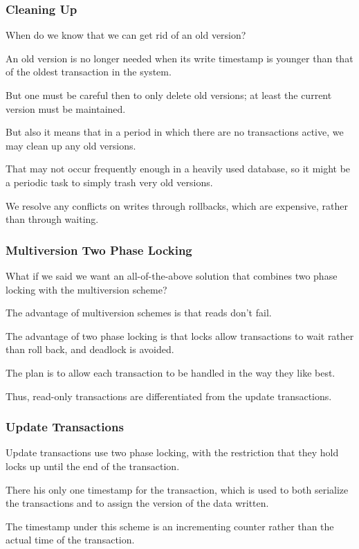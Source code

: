 \begin{frame}
\frametitle{Cleaning Up}

When do we know that we can get rid of an old version? 

An old version is no longer needed when its write timestamp is younger than that of the oldest transaction in the system. 

But one must be careful then to only delete old versions; at least the current version must be maintained. 

But also it means that in a period in which there are no transactions active, we may clean up any old versions. 

That may not occur frequently enough in a heavily used database, so it might be a periodic task to simply trash very old versions.

We resolve any conflicts on writes through rollbacks, which are expensive, rather than through waiting.

\end{frame}

\begin{frame}
\frametitle{Multiversion Two Phase Locking}

What if we said we want an all-of-the-above solution that combines two phase locking with the multiversion scheme? 

The advantage of multiversion schemes is that reads don't fail. 

The advantage of two phase locking is that locks allow transactions to wait rather than roll back, and deadlock is avoided. 

The plan is to allow each transaction to be handled in the way they like best. 

Thus, read-only transactions are differentiated from the update transactions.


\end{frame}


\begin{frame}
\frametitle{Update Transactions}
Update transactions use two phase locking, with the restriction that they hold locks up until the end of the transaction. 

There his only one timestamp for the transaction, which is used to both serialize the transactions and to assign the version of the data written.

The timestamp under this scheme is an incrementing counter rather than the actual time of the transaction. 

\end{frame}

